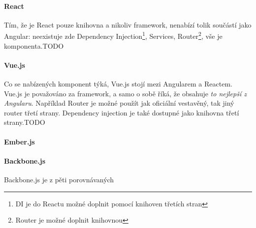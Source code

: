 \paragraph{React} Tím, že je React pouze knihovna a nikoliv framework, nenabízí tolik součástí jako Angular: neexistuje zde Dependency Injection\footnote{DI je do Reactu možné doplnit pomocí knihoven třetích stran}, Services, Router\footnote{Router je možné doplnit knihovnou}, vše je komponenta.TODO

\paragraph{Vue.js} Co se nabízených komponent týká, Vue.js stojí mezi Angularem a Reactem. Vue.js je považováno za framework, a samo o sobě říká, že obsahuje \emph{to nejlepší z Angularu}. Například Router je možné použít jak oficiální vestavěný, tak jiný router třetí strany\cite{vue-routers}. Dependency injection je také dostupné jako knihovna třetí strany.TODO

\paragraph{Ember.js} 

\paragraph{Backbone.js} Backbone.js je z pěti porovnávaných 

